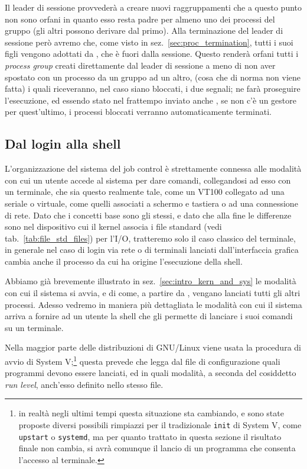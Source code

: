 Il leader di sessione provvederà a creare nuovi raggruppamenti che a questo
punto non sono orfani in quanto esso resta padre per almeno uno dei processi
del gruppo (gli altri possono derivare dal primo). Alla terminazione del
leader di sessione però avremo che, come visto in
sez.~\ref{sec:proc_termination}, tutti i suoi figli vengono adottati da
, che è fuori dalla sessione. Questo renderà orfani tutti i
\textit{process group} creati direttamente dal leader di sessione a meno di
non aver spostato con  un processo da un gruppo ad un altro,
(cosa che di norma non viene fatta) i quali riceveranno, nel caso siano
bloccati, i due segnali;  ne farà proseguire l'esecuzione, ed
essendo stato nel frattempo inviato anche , se non c'è un
gestore per quest'ultimo, i processi bloccati verranno automaticamente
terminati.



\subsection{Dal login alla shell}
\label{sec:sess_login}

L'organizzazione del sistema del job control è strettamente connessa alle
modalità con cui un utente accede al sistema per dare comandi, collegandosi ad
esso con un terminale, che sia questo realmente tale, come un VT100 collegato
ad una seriale o virtuale, come quelli associati a schermo e tastiera o ad una
connessione di rete. Dato che i concetti base sono gli stessi, e dato che alla
fine le differenze sono nel dispositivo cui il kernel associa i file standard
(vedi tab.~\ref{tab:file_std_files}) per l'I/O, tratteremo solo il caso
classico del terminale, in generale nel caso di login via rete o di terminali
lanciati dall'interfaccia grafica cambia anche il processo da cui ha origine
l'esecuzione della shell.

Abbiamo già brevemente illustrato in sez.~\ref{sec:intro_kern_and_sys} le
modalità con cui il sistema si avvia, e di come, a partire da ,
vengano lanciati tutti gli altri processi. Adesso vedremo in maniera più
dettagliata le modalità con cui il sistema arriva a fornire ad un utente la
shell che gli permette di lanciare i suoi comandi su un terminale.

Nella maggior parte delle distribuzioni di GNU/Linux viene usata la procedura
di avvio di System V;\footnote{in realtà negli ultimi tempi questa situazione
  sta cambiando, e sono state proposte diversi possibili rimpiazzi per il
  tradizionale \texttt{init} di System V, come \texttt{upstart} o
  \texttt{systemd}, ma per quanto trattato in questa sezione il risultato
  finale non cambia, si avrà comunque il lancio di un programma che consenta
  l'accesso al terminale.}  questa prevede che  legga dal file di
configurazione  quali programmi devono essere lanciati,
ed in quali modalità, a seconda del cosiddetto \textit{run level}, anch'esso
definito nello stesso file.

